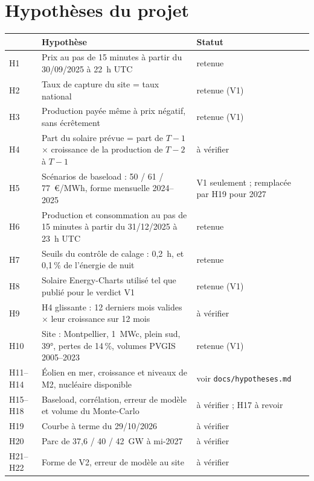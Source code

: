 \documentclass[11pt,a4paper]{article}
\newcommand{\code}[1]{\texttt{\small #1}}
\begin{document}
\appendix
\section{Hypothèses du projet}

\begin{center}
\small
\begin{tabularx}{\linewidth}{lYl}
\toprule
& \textbf{Hypothèse} & \textbf{Statut} \\
\midrule
H1 & Prix au pas de 15 minutes à partir du 30/09/2025 à 22~h UTC & retenue \\
H2 & Taux de capture du site = taux national & retenue (V1) \\
H3 & Production payée même à prix négatif, sans écrêtement & retenue (V1) \\
H4 & Part du solaire prévue = part de $T-1$ $\times$ croissance de la production de $T-2$ à $T-1$ & à vérifier \\
H5 & Scénarios de baseload : 50 / 61 / 77~€/MWh, forme mensuelle 2024--2025 & V1 seulement ; remplacée par H19 pour 2027 \\
H6 & Production et consommation au pas de 15 minutes à partir du 31/12/2025 à 23~h UTC & retenue \\
H7 & Seuils du contrôle de calage : 0,2~h, et 0,1\,\% de l'énergie de nuit & retenue \\
H8 & Solaire Energy-Charts utilisé tel que publié pour le verdict V1 & retenue (V1) \\
H9 & H4 glissante : 12 derniers mois valides $\times$ leur croissance sur 12 mois & à vérifier \\
H10 & Site : Montpellier, 1~MWc, plein sud, 39°, pertes de 14\,\%, volumes PVGIS 2005--2023 & retenue (V1) \\
H11--H14 & Éolien en mer, croissance et niveaux de M2, nucléaire disponible & voir \code{docs/hypotheses.md} \\
H15--H18 & Baseload, corrélation, erreur de modèle et volume du Monte-Carlo & à vérifier ; H17 à revoir \\
H19 & Courbe à terme du 29/10/2026 & à vérifier \\
H20 & Parc de 37,6 / 40 / 42~GW à mi-2027 & à vérifier \\
H21--H22 & Forme de V2, erreur de modèle au site & à vérifier \\
\bottomrule
\end{tabularx}
\end{center}
\end{document}
